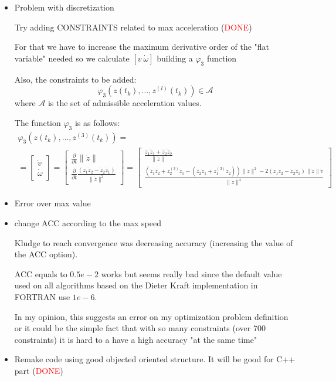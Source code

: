 \begin{itemize}
\item Problem with discretization

Try adding CONSTRAINTS related to max acceleration (\textcolor{red}{DONE})

For that we have to increase the maximum derivative order of the "flat variable" needed so we calculate $[\dot{v}\ \dot{\omega}]$ building a $\varphi_3$ function

Also, the constraints to be added:
\[
	\varphi_3(z(t_k),\dotsc,z^{(l)}(t_k)) \in \mathcal{A}
\]
where $\mathcal{A}$ is the set of admissible acceleration values.

The function $\varphi_3$ is as follows:
\[
\begin{array}{l}
\varphi_3(z(t_k),\dotsc,z^{(3)}(t_k))=\\
=\left[\begin{array}{c}
\dot{v}\\
\dot{\omega}
\end{array}\right]
= \left[\begin{array}{c}
\frac{\partial}{\partial t}\|\dot{z}\|\\
\frac{\partial}{\partial t}\frac{(\dot{z}_1\ddot{z}_2-\dot{z}_2\ddot{z}_1)}{\|\dot{z}\|^2}
\end{array}\right] = \left[\begin{array}{c}
\frac{\dot{z}_1\ddot{z}_1 + \dot{z}_2\ddot{z}_2}{\|\dot{z}\|}\\
\frac{(\ddot{z}_1\ddot{z}_2+ z^{(3)}_2\dot{z}_1 - (\ddot{z}_2\ddot{z}_1+z^{(3)}_1\dot{z}_2))\|\dot{z}\|^2-2(\dot{z}_1\ddot{z}_2-\dot{z}_2\ddot{z}_1)\|\dot{z}\|\dot{v}}{\|\dot{z}\|^4}
\end{array}\right]
\end{array}
\]

\item Error over max value
\item change ACC according to the max speed

Kludge to reach convergence was decreasing accuracy (increasing the value of the ACC option).

ACC equals to $0.5e-2$ works but seems really bad since the default value used on all algorithms based on the Dieter Kraft implementation in FORTRAN use $1e-6$.

In my opinion, this suggests an error on my optimization problem definition or it could be the simple fact that with so many constraints (over 700 constraints) it is hard to a have a high accuracy "at the same time"

\item Remake code using good objected oriented structure. It will be good for C++ part (\textcolor{red}{DONE})

\end{itemize}


